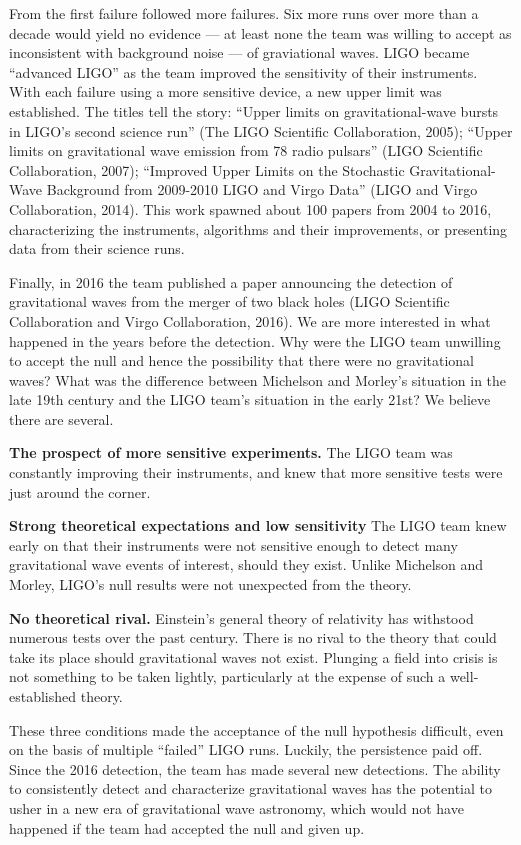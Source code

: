 \documentclass[english,floatsintext,man]{apa6}
\theoremstyle{definition}
\theoremstyle{definition}
\theoremstyle{definition}
\theoremstyle{remark}
\begin{document}
From the first failure followed more failures. Six more runs over more
than a decade would yield no evidence --- at least none the team was
willing to accept as inconsistent with background noise --- of
graviational waves. LIGO became \enquote{advanced LIGO} as the team
improved the sensitivity of their instruments. With each failure using a
more sensitive device, a new upper limit was established. The titles
tell the story: \enquote{Upper limits on gravitational-wave bursts in
LIGO's second science run} (The LIGO Scientific Collaboration, 2005);
\enquote{Upper limits on gravitational wave emission from 78 radio
pulsars} (LIGO Scientific Collaboration, 2007); \enquote{Improved Upper
Limits on the Stochastic Gravitational-Wave Background from 2009-2010
LIGO and Virgo Data} (LIGO and Virgo Collaboration, 2014). This work
spawned about 100 papers from 2004 to 2016, characterizing the
instruments, algorithms and their improvements, or presenting data from
their science runs.

Finally, in 2016 the team published a paper announcing the detection of
gravitational waves from the merger of two black holes (LIGO Scientific
Collaboration and Virgo Collaboration, 2016). We are more interested in
what happened in the years before the detection. Why were the LIGO team
unwilling to accept the null and hence the possibility that there were
no gravitational waves? What was the difference between Michelson and
Morley's situation in the late 19th century and the LIGO team's
situation in the early 21st? We believe there are several.

\textbf{The prospect of more sensitive experiments.} The LIGO team was
constantly improving their instruments, and knew that more sensitive
tests were just around the corner.

\textbf{Strong theoretical expectations and low sensitivity} The LIGO
team knew early on that their instruments were not sensitive enough to
detect many gravitational wave events of interest, should they exist.
Unlike Michelson and Morley, LIGO's null results were not unexpected
from the theory.

\textbf{No theoretical rival.} Einstein's general theory of relativity
has withstood numerous tests over the past century. There is no rival to
the theory that could take its place should gravitational waves not
exist. Plunging a field into crisis is not something to be taken
lightly, particularly at the expense of such a well-established theory.

These three conditions made the acceptance of the null hypothesis
difficult, even on the basis of multiple \enquote{failed} LIGO runs.
Luckily, the persistence paid off. Since the 2016 detection, the team
has made several new detections. The ability to consistently detect and
characterize gravitational waves has the potential to usher in a new era
of gravitational wave astronomy, which would not have happened if the
team had accepted the null and given up.
\end{document}
